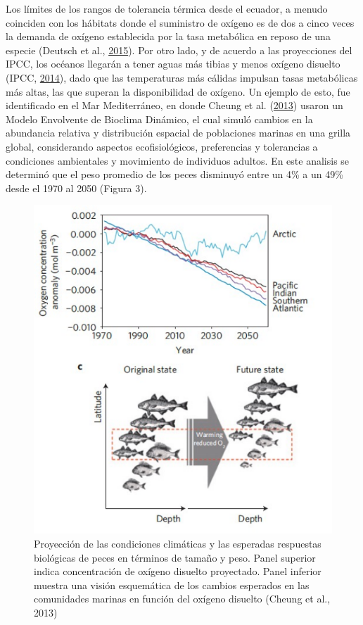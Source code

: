\documentclass[
]{article}
\begin{document}
Los límites de los rangos de tolerancia térmica desde el ecuador, a
menudo coinciden con los hábitats donde el suministro de oxígeno es de
dos a cinco veces la demanda de oxígeno establecida por la tasa
metabólica en reposo de una especie (Deutsch et al.,
\protect\hyperlink{ref-Deutsch2015}{2015}). Por otro lado, y de acuerdo
a las proyecciones del IPCC, los océanos llegarán a tener aguas más
tibias y menos oxígeno disuelto (IPCC,
\protect\hyperlink{ref-IPCC2014}{2014}), dado que las temperaturas más
cálidas impulsan tasas metabólicas más altas, las que superan la
disponibilidad de oxígeno. Un ejemplo de esto, fue identificado en el
Mar Mediterráneo, en donde Cheung et al.
(\protect\hyperlink{ref-Cheung2013}{2013}) usaron un Modelo Envolvente
de Bioclima Dinámico, el cual simuló cambios en la abundancia relativa y
distribución espacial de poblaciones marinas en una grilla global,
considerando aspectos ecofisiológicos, preferencias y tolerancias a
condiciones ambientales y movimiento de individuos adultos. En este
analisis se determinó que el peso promedio de los peces disminuyó entre
un 4\% a un 49\% desde el 1970 al 2050 (Figura 3).

\newpage

\begin{figure}

{\centering \includegraphics[width=1\linewidth]{images/Exa18} 

}

\caption{Proyección de las condiciones climáticas y las esperadas respuestas biológicas de peces en términos de tamaño y peso. Panel superior indica concentración de oxígeno disuelto proyectado. Panel inferior muestra una visión esquemática de los cambios esperados en las comunidades marinas en función del oxígeno disuelto (Cheung et al., 2013)}\label{fig:unnamed-chunk-3}
\end{figure}
\end{document}
